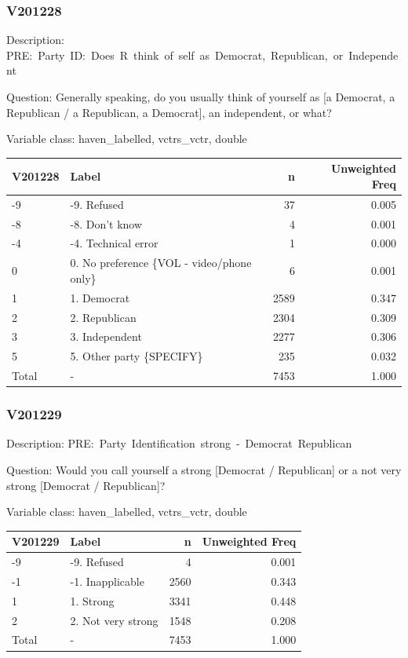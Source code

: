 \documentclass[
]{krantz}
\begin{document}
\hypertarget{v201228}{%
\subsubsection*{V201228}\label{v201228}}


Description: PRE:~Party~ID:~Does~R~think~of~self~as~Democrat,~Republican,~or~Independent

Question: Generally speaking, do you usually think of yourself as {[}a Democrat, a Republican / a Republican, a Democrat{]}, an independent, or what?

Variable class: haven\_labelled, vctrs\_vctr, double

\begin{tabular}[t]{l|l|r|r}
\hline
V201228 & Label & n & Unweighted Freq\\
\hline
-9 & -9. Refused & 37 & 0.005\\
\hline
-8 & -8. Don't know & 4 & 0.001\\
\hline
-4 & -4. Technical error & 1 & 0.000\\
\hline
0 & 0. No preference \{VOL - video/phone only\} & 6 & 0.001\\
\hline
1 & 1. Democrat & 2589 & 0.347\\
\hline
2 & 2. Republican & 2304 & 0.309\\
\hline
3 & 3. Independent & 2277 & 0.306\\
\hline
5 & 5. Other party \{SPECIFY\} & 235 & 0.032\\
\hline
Total & - & 7453 & 1.000\\
\hline
\end{tabular}

\hypertarget{v201229}{%
\subsubsection*{V201229}\label{v201229}}


Description: PRE:~Party~Identification~strong~-~Democrat~Republican

Question: Would you call yourself a strong {[}Democrat / Republican{]} or a not very strong {[}Democrat / Republican{]}?

Variable class: haven\_labelled, vctrs\_vctr, double

\begin{tabular}[t]{l|l|r|r}
\hline
V201229 & Label & n & Unweighted Freq\\
\hline
-9 & -9. Refused & 4 & 0.001\\
\hline
-1 & -1. Inapplicable & 2560 & 0.343\\
\hline
1 & 1. Strong & 3341 & 0.448\\
\hline
2 & 2. Not very strong & 1548 & 0.208\\
\hline
Total & - & 7453 & 1.000\\
\hline
\end{tabular}
\end{document}
